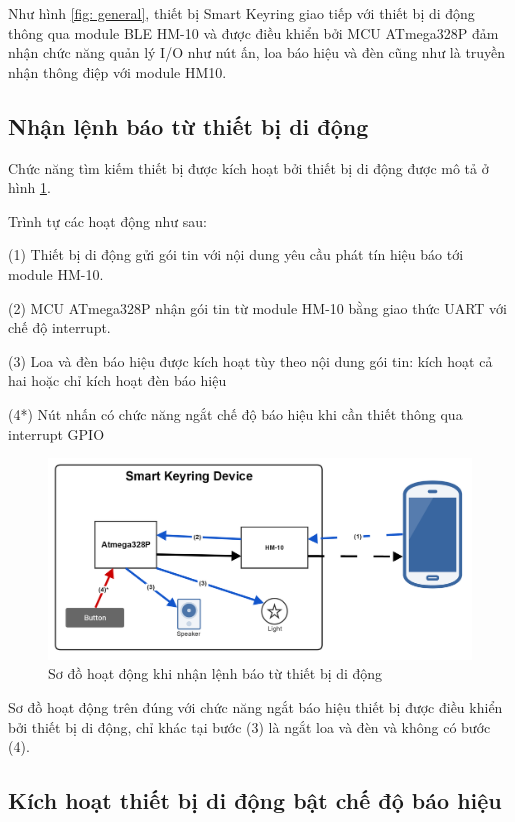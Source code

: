 Như hình \ref{fig: general}, thiết bị Smart Keyring giao tiếp với thiết bị di động thông qua module BLE HM-10 và được điều khiển bởi MCU ATmega328P đảm nhận chức năng quản lý I/O như nút ấn, loa báo hiệu và đèn cũng như là truyền nhận thông điệp với module HM10.

\subsection{Nhận lệnh báo từ thiết bị di động}

Chức năng tìm kiếm thiết bị được kích hoạt bởi thiết bị di động được mô tả ở hình \ref{fig: ring1}.

Trình tự các hoạt động như sau:

(1) Thiết bị di động gửi gói tin với nội dung yêu cầu phát tín hiệu báo tới module HM-10.

(2) MCU ATmega328P nhận gói tin từ module HM-10 bằng giao thức UART với chế độ interrupt.

(3) Loa và đèn báo hiệu được kích hoạt tùy theo nội dung gói tin: kích hoạt cả hai hoặc chỉ kích hoạt đèn báo hiệu

(4*) Nút nhấn có chức năng ngắt chế độ báo hiệu khi cần thiết thông qua interrupt GPIO

\begin{figure}[h]
	\centering    
	\includegraphics[width=1.0\textwidth]{ring1}
	\caption[Sơ đồ hoạt động khi nhận lệnh báo từ thiết bị di động]{Sơ đồ hoạt động khi nhận lệnh báo từ thiết bị di động}
	\label{fig: ring1}
\end{figure}

Sơ đồ hoạt động trên đúng với chức năng ngắt báo hiệu thiết bị được điều khiển bởi thiết bị di động, chỉ khác tại bước (3) là ngắt loa và đèn và không có bước (4).
\subsection{Kích hoạt thiết bị di động bật chế độ báo hiệu}


